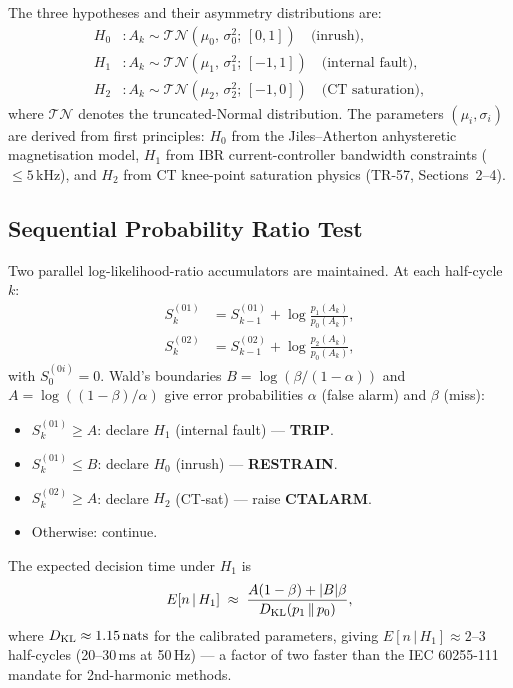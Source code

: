 The three hypotheses and their asymmetry distributions are:
\begin{align}
  H_0 &: A_k \sim \mathcal{TN}(\mu_0,\,\sigma_0^2;\,[0,1])
         \quad \text{(inrush)}, \\
  H_1 &: A_k \sim \mathcal{TN}(\mu_1,\,\sigma_1^2;\,[-1,1])
         \quad \text{(internal fault)}, \\
  H_2 &: A_k \sim \mathcal{TN}(\mu_2,\,\sigma_2^2;\,[-1,0])
         \quad \text{(CT saturation)},
  \label{eq:ch5_hypotheses}
\end{align}
where $\mathcal{TN}$ denotes the truncated-Normal distribution.
The parameters $(\mu_i, \sigma_i)$ are derived from first principles:
$H_0$ from the Jiles--Atherton anhysteretic magnetisation model,
$H_1$ from IBR current-controller bandwidth constraints ($\leq 5$\,kHz),
and $H_2$ from CT knee-point saturation physics (TR-57, Sections~2--4).

\subsection{Sequential Probability Ratio Test}
\label{sec:ch5_sequential}

Two parallel log-likelihood-ratio accumulators are maintained.
At each half-cycle $k$:
\begin{align}
  S^{(01)}_k &= S^{(01)}_{k-1} + \log\frac{p_1(A_k)}{p_0(A_k)}, \\
  S^{(02)}_k &= S^{(02)}_{k-1} + \log\frac{p_2(A_k)}{p_0(A_k)},
  \label{eq:ch5_llr}
\end{align}
with $S^{(0i)}_0 = 0$.
Wald's boundaries $B = \log(\beta / (1-\alpha))$ and
$A = \log((1-\beta)/\alpha)$ give error probabilities $\alpha$ (false alarm)
and $\beta$ (miss):
\begin{itemize}
  \item $S^{(01)}_k \geq A$: declare $H_1$ (internal fault) — \textbf{TRIP}.
  \item $S^{(01)}_k \leq B$: declare $H_0$ (inrush) — \textbf{RESTRAIN}.
  \item $S^{(02)}_k \geq A$: declare $H_2$ (CT-sat) — raise \textbf{CTALARM}.
  \item Otherwise: continue.
\end{itemize}

The expected decision time under $H_1$ is
\begin{equation}
  E[n\,|\,H_1] \;\approx\; \frac{A(1-\beta) + |B|\beta}{D_{\rm KL}(p_1 \,\|\, p_0)},
  \label{eq:ch5_esc}
\end{equation}
where $D_{\rm KL} \approx 1.15\,\text{nats}$ for the calibrated parameters,
giving $E[n\,|\,H_1] \approx 2$--3 half-cycles (20--30\,ms at 50\,Hz) —
a factor of two faster than the IEC 60255-111 mandate for 2nd-harmonic methods.

